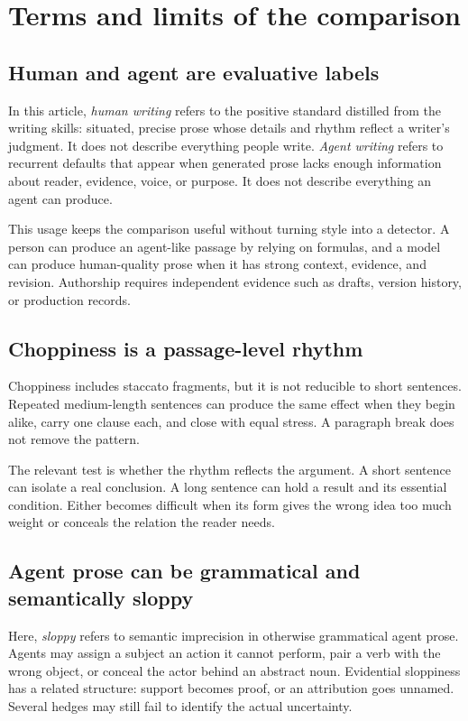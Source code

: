 \section{Terms and limits of the comparison}
\label{app:dimensions}

\subsection{Human and agent are evaluative labels}

In this article, \emph{human writing} refers to the positive standard distilled
from the writing skills: situated, precise prose whose details and rhythm
reflect a writer's judgment. It does not describe everything people write.
\emph{Agent writing} refers to recurrent defaults that appear when generated
prose lacks enough information about reader, evidence, voice, or purpose. It
does not describe everything an agent can produce.

This usage keeps the comparison useful without turning style into a detector.
A person can produce an agent-like passage by relying on formulas, and a model
can produce human-quality prose when it has strong context, evidence, and
revision. Authorship requires independent evidence such as drafts, version
history, or production records.

\subsection{Choppiness is a passage-level rhythm}

Choppiness includes staccato fragments, but it is not reducible to short
sentences. Repeated medium-length sentences can produce the same effect when
they begin alike, carry one clause each, and close with equal stress. A
paragraph break does not remove the pattern.

The relevant test is whether the rhythm reflects the argument. A short
sentence can isolate a real conclusion. A long sentence can hold a result and
its essential condition. Either becomes difficult when its form gives the
wrong idea too much weight or conceals the relation the reader needs.

\subsection{Agent prose can be grammatical and semantically sloppy}

Here, \emph{sloppy} refers to semantic imprecision in otherwise grammatical
agent prose. Agents may assign a subject an action it cannot perform, pair a
verb with the wrong object, or conceal the actor behind an abstract noun.
Evidential sloppiness has a related structure: support becomes proof, or an
attribution goes unnamed. Several hedges may still fail to identify the actual
uncertainty.

